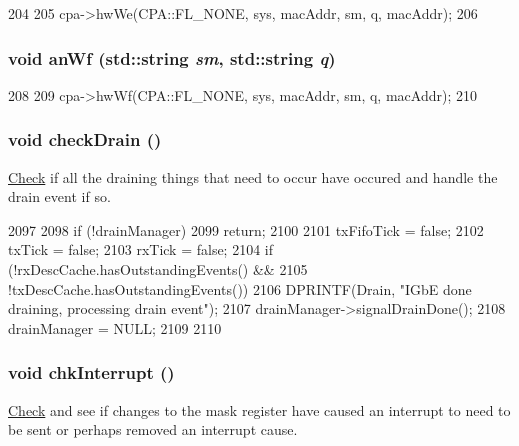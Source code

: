 \begin{DoxyCode}
204                                          {
205         cpa->hwWe(CPA::FL_NONE, sys, macAddr, sm, q, macAddr);
206     }
\end{DoxyCode}
\hypertarget{classIGbE_a09c6a12f9551bd90d913dfe8ed396a67}{
\subsubsection[{anWf}]{\setlength{\rightskip}{0pt plus 5cm}void anWf (std::string {\em sm}, \/  std::string {\em q})}}
\label{classIGbE_a09c6a12f9551bd90d913dfe8ed396a67}



\begin{DoxyCode}
208                                          {
209         cpa->hwWf(CPA::FL_NONE, sys, macAddr, sm, q, macAddr);
210     }
\end{DoxyCode}
\hypertarget{classIGbE_a97cbf86aeda5390deb20b1d39396d111}{
\subsubsection[{checkDrain}]{\setlength{\rightskip}{0pt plus 5cm}void checkDrain ()}}
\label{classIGbE_a97cbf86aeda5390deb20b1d39396d111}
\hyperlink{classCheck}{Check} if all the draining things that need to occur have occured and handle the drain event if so. 


\begin{DoxyCode}
2097 {
2098     if (!drainManager)
2099         return;
2100 
2101     txFifoTick = false;
2102     txTick = false;
2103     rxTick = false;
2104     if (!rxDescCache.hasOutstandingEvents() &&
2105         !txDescCache.hasOutstandingEvents()) {
2106         DPRINTF(Drain, "IGbE done draining, processing drain event\n");
2107         drainManager->signalDrainDone();
2108         drainManager = NULL;
2109     }
2110 }
\end{DoxyCode}
\hypertarget{classIGbE_a29bfbbe58f3015bfb026c019295a8836}{
\subsubsection[{chkInterrupt}]{\setlength{\rightskip}{0pt plus 5cm}void chkInterrupt ()}}
\label{classIGbE_a29bfbbe58f3015bfb026c019295a8836}
\hyperlink{classCheck}{Check} and see if changes to the mask register have caused an interrupt to need to be sent or perhaps removed an interrupt cause. 


